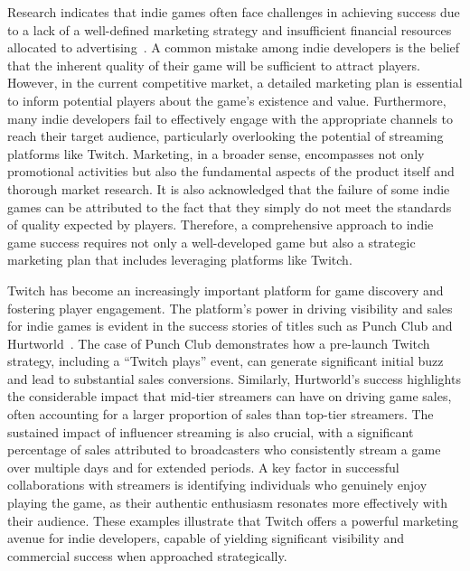 \documentclass[conference]{IEEEtran}
\begin{document}
Research indicates that indie games often face challenges in achieving success due to a lack of a well-defined marketing strategy and insufficient financial resources allocated to advertising~\cite{indie_games_fail}. A common mistake among indie developers is the belief that the inherent quality of their game will be sufficient to attract players. However, in the current competitive market, a detailed marketing plan is essential to inform potential players about the game's existence and value. Furthermore, many indie developers fail to effectively engage with the appropriate channels to reach their target audience, particularly overlooking the potential of streaming platforms like Twitch. Marketing, in a broader sense, encompasses not only promotional activities but also the fundamental aspects of the product itself and thorough market research. It is also acknowledged that the failure of some indie games can be attributed to the fact that they simply do not meet the standards of quality expected by players. Therefore, a comprehensive approach to indie game success requires not only a well-developed game but also a strategic marketing plan that includes leveraging platforms like Twitch.

Twitch has become an increasingly important platform for game discovery and fostering player engagement. The platform's power in driving visibility and sales for indie games is evident in the success stories of titles such as Punch Club and Hurtworld~\cite{twitch_game_creator_success}. The case of Punch Club demonstrates how a pre-launch Twitch strategy, including a ``Twitch plays'' event, can generate significant initial buzz and lead to substantial sales conversions. Similarly, Hurtworld's success highlights the considerable impact that mid-tier streamers can have on driving game sales, often accounting for a larger proportion of sales than top-tier streamers. The sustained impact of influencer streaming is also crucial, with a significant percentage of sales attributed to broadcasters who consistently stream a game over multiple days and for extended periods. A key factor in successful collaborations with streamers is identifying individuals who genuinely enjoy playing the game, as their authentic enthusiasm resonates more effectively with their audience. These examples illustrate that Twitch offers a powerful marketing avenue for indie developers, capable of yielding significant visibility and commercial success when approached strategically.
\end{document}
